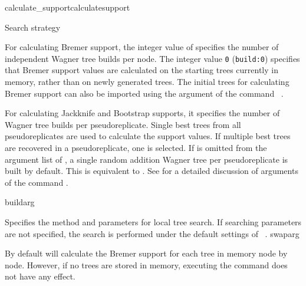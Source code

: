 \begin{command}{calculate\_support}{calculatesupport}
\begin{arguments}
\begin{argumentgroup}{Search strategy}
             {For calculating Bremer support, the integer value of
              specifies the number of independent
             Wagner tree builds per node. The integer value \texttt{0}
             (\texttt{build:0}) specifies that Bremer support values are
             calculated on the starting trees currently
             in memory, rather than on newly generated trees.
             The initial trees for calculating Bremer support
             can also be imported using the argument 
             of the command ~.
             
             For calculating Jackknife
             and Bootstrap supports, it specifies the number of
             Wagner tree builds per pseudoreplicate.  Single best trees from all
             pseudoreplicates are used to calculate the support values. If
             multiple best trees are recovered in a pseudoreplicate, one 
             is selected. If  is
             omitted from the argument list of ,
             a single random addition Wagner tree per
             pseudoreplicate is built by default. This is equivalent to 
             . See
              for a detailed discussion of
             arguments of the command .}
             {buildarg}

            {Specifies the method and parameters for local tree search. If searching
            parameters are not specified, the search is performed under
            the default settings of ~.} 
            {swaparg}
	     
        		\end{argumentgroup}

	\end{arguments}

    {By default \poy will calculate the Bremer support for each tree in memory node by node.
    However, if no trees are stored in memory, executing the command
     does not have any effect.}
  
    
      

\end{command}
